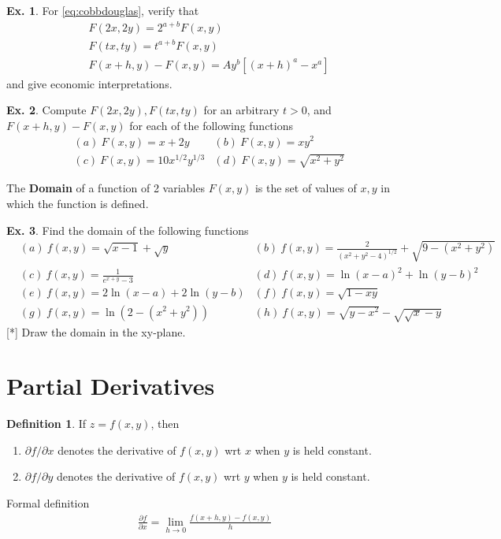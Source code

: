 \documentclass[10pt,a4paper]{book}
\theoremstyle{definition}\newtheorem{definition}{Definition}
\theoremstyle{definition}\newtheorem{fact}{Fact}
\theoremstyle{definition}\newtheorem{ex}{Ex.}
\theoremstyle{definition}\newtheorem{project}{Project}
\theoremstyle{definition}\newtheorem{problem}{Problem}
\theoremstyle{definition}\newtheorem{example}{Example}
\numberwithin{theorem}{chapter}
\numberwithin{corollary}{chapter}
\numberwithin{assumption}{chapter}
\numberwithin{definition}{chapter}
\numberwithin{prop}{chapter}
\numberwithin{notation}{chapter}
\numberwithin{problem}{chapter}
\numberwithin{example}{chapter}
\numberwithin{fact}{chapter}
\numberwithin{ex}{chapter}
\newenvironment{fdefinition}
{\begin{mdframed}\begin{definition}}
		{\end{definition}\end{mdframed}}
\begin{document}
	\begin{ex}
		For \eqref{eq:cobbdouglas}, verify that
		\begin{align*}
			& F(2x,2y) = 2^{a+b} F(x,y)                 \\
			& F(tx,ty) = t^{a+b} F(x,y)                 \\
			& F(x+h,y) - F(x,y) = A y^b [(x+h)^a - x^a] 
		\end{align*}
		and give economic interpretations.
	\end{ex}
	
	\begin{ex}
		Compute $F(2x, 2y), F(tx, ty)$ for an arbitrary $t>0$, and $F(x+h,y) - F(x,y)$ for each of the following functions
		\begin{align*}
			& (a) \ F(x,y) = x + 2y             
			& (b) \ F(x,y) = xy^2               \\
			& (c) \ F(x,y) = 10 x^{1/2} y^{1/3} 
			& (d) \ F(x,y) = \sqrt{x^2 + y^2}   
		\end{align*}
	\end{ex} 
	
	The \textbf{Domain} of a function of 2 variables $F(x,y)$ is the set of values of $x,y$ in which the function is defined.
	
	\begin{ex}
		Find the domain of the following functions
		\begin{align*}
			& (a) \ f(x,y) = \sqrt{x-1} + \sqrt{y}                            
			& (b) \ f(x,y) = \frac{2}{(x^2+y^2-4)^{1/2}} + \sqrt{9-(x^2+y^2)} \\
			& (c) \ f(x,y) = \frac{1}{e^{x+y} - 3}                            
			& (d) \ f(x,y) = \ln(x-a)^2 + \ln(y-b)^2                          \\
			& (e) \ f(x,y) = 2\ln(x-a) + 2\ln(y-b)                            
			& (f) \ f(x,y) = \sqrt{1-xy}                                      \\
			& (g) \ f(x,y) = \ln(2-(x^2+y^2))                                 
			& (h) \ f(x,y) = \sqrt{y-x^2} - \sqrt{\sqrt{x}-y}                 
		\end{align*}
		[*] Draw the domain in the xy-plane.
	\end{ex}
	
	\section{Partial Derivatives}
	\begin{fdefinition}
		If $z=f(x,y)$, then
		\begin{enumerate}
			\item $\partial f/\partial x$ denotes the derivative of $f(x,y)$ wrt $x$ when $y$ is held constant.
			\item $\partial f/\partial y$ denotes the derivative of $f(x,y)$ wrt $y$ when $y$ is held constant.
		\end{enumerate}
		Formal definition
		\begin{align*}
			\frac{\partial f}{\partial x} = \lim_{h \to 0} \frac{f(x+h,y) - f(x,y)}{h} 
		\end{align*}
	\end{fdefinition}
	
\end{document}
